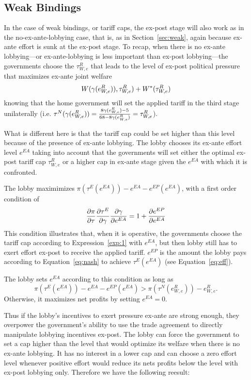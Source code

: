\subsection{Weak Bindings}
In the case of weak bindings, or tariff caps, the ex-post stage will also work as in the no-ex-ante-lobbying case, that is, as in Section~\ref{sec:weak}, again because ex-ante effort is sunk at the ex-post stage. To recap, when there is no ex-ante lobbying---or ex-ante-lobbying is less important than ex-post lobbying---the governments choose the $\tau^R_{W,e}$ that leads to the level of ex-post political pressure that maximizes ex-ante joint welfare
		\[
		  W(\gamma(e^R_{W,e})),\tau^R_{W,e}) + W^*(\tau^R_{W,e})
		\]
		knowing that the home government will set the applied tariff in the third stage unilaterally (i.e. $\tau^N(\gamma(e^R_{W,e})) = \frac{8\gamma(e^R_{W,e}) - 5}{68 - 8 \gamma(e^R_{W,e})} = \tau^R_{W,e}$).
						
What is different here is that the tariff cap could be set higher than this level because of the presence of ex-ante lobbying. The lobby chooses its ex-ante effort level $e^{EA}$ taking into account that the governments will set either the optimal ex-post tariff cap $\tau^R_{W,e}$ or a higher cap in ex-ante stage given the $e^{EA}$ with which it is confronted.

The lobby maximimizes $\pi(\tau^E(e^{EA})) - e^{EA} - e^{EP}(e^{EA})$, with a first order condition of 
	\begin{equation}
	  \frac{\partial \pi}{\partial \tau} \frac{\partial \tau^E}{\partial \gamma} \frac{\partial \gamma}{\partial e^{EA}} = 1 +\frac{\partial e^{EP}}{\partial e^{EA}}
			\label{eq:ea}
	\end{equation}
This condition illustrates that, when it is operative, the governments choose the tariff cap according to Expression~\ref{exp:1} with $e^{EA}$, but then lobby still has to exert effort ex-post to receive the applied tariff. $e^{EP}$ is the amount the lobby pays according to Equation~\ref{eq:nash} to achieve $\tau^E(e^{EA})$ (see Equation~\ref{eq:eff}).

The lobby sets $e^{EA}$ according to this condition as long as 
	\begin{equation}
		\pi(\tau^E(e^{EA})) - e^{EA} - e^{EP}(e^{EA}) > \pi(\tau^N(e^R_{W,e})) - e^R_{W,e}.
		\label{ine:ea}
	\end{equation}
Otherwise, it maximizes net profits by setting $e^{EA} =0$.	

Thus if the lobby's incentives to exert pressure ex-ante are strong enough, they overpower the government's ability to use the trade agreement to directly manipulate lobbying incentives ex-post. The lobby can force the government to set a cap higher than the level that would optimize its welfare when there is no ex-ante lobbying. It has no interest in a lower cap and can choose a zero effort level whenever positive effort would reduce its nets profits below the level with ex-post lobbying only. Therefore we have the following reesult:
		
